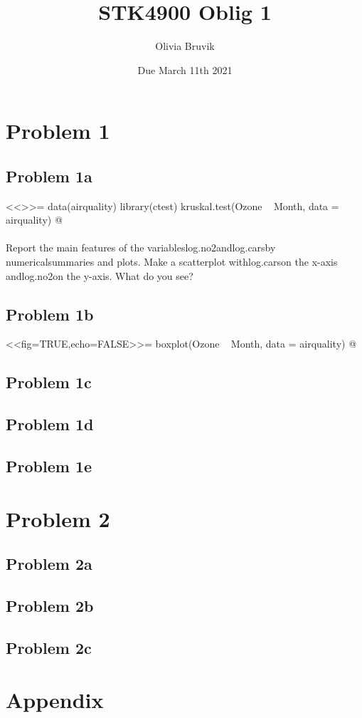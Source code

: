 \documentclass[a4paper]{article}
\title{STK4900 Oblig 1}
\author{Olivia Bruvik}
\date{Due March 11th 2021}
\begin{document}
	\maketitle
	
	\section{Problem 1}
	
	\subsection{Problem 1a}
	
	<<>>=
	data(airquality)
	library(ctest)
	kruskal.test(Ozone ~ Month, data = airquality)
	@
	
	\paragraph{}
	Report  the  main  features  of  the  variableslog.no2andlog.carsby  numericalsummaries and plots.  Make a scatterplot withlog.carson the x-axis andlog.no2on the y-axis.  What do you see?

	\subsection{Problem 1b}
	
	\begin{center}
		<<fig=TRUE,echo=FALSE>>=
		boxplot(Ozone ~ Month, data = airquality)
		@
	\end{center}
	
	\subsection{Problem 1c}
	
	\subsection{Problem 1d}
	
	\subsection{Problem 1e}
	
	\section{Problem 2}
	
	\subsection{Problem 2a}
	
	\subsection{Problem 2b}
	
	\subsection{Problem 2c}
	
	\section{Appendix}
	
\end{document}
